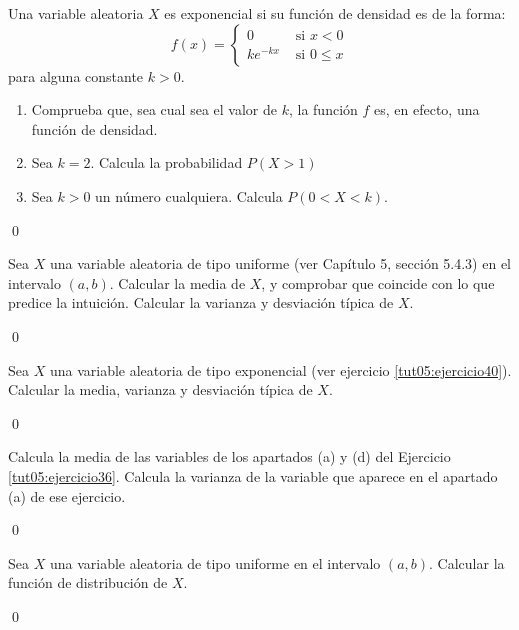 \documentclass[10pt,a4paper]{article}\usepackage[]{graphicx}\usepackage[]{color}
\newcounter{cont01}
\newcounter{EjerExpo}
\begin{document}
\begin{ejercicio}
\label{tut05:ejercicio40}
Una variable aleatoria $X$ es {\sf exponencial} si su función de densidad es de la forma:
	\[f(x)=\begin{cases}
    0&\mbox{ si } x<0\\
    ke^{-kx}&\mbox{ si }0\leq x
    \end{cases}
    \]
    para alguna constante $k>0$.
    \begin{enumerate}
    	\item Comprueba que, sea cual sea el valor de $k$, la función $f$ es, en efecto, una función de 				densidad.
        \item Sea $k=2$. Calcula la probabilidad $P(X>1)$
        \item Sea $k>0$ un número cualquiera. Calcula $P(0<X<k)$.
    \end{enumerate}
    \setcounter{EjerExpo}{\theenumi}

    \setcounter{cont01}{\theenumi}


\qed\end{ejercicio}
\begin{ejercicio}
\label{tut05:ejercicio41}
Sea $X$ una variable aleatoria de tipo uniforme (ver Capítulo 5, sección 5.4.3) en el 					intervalo $(a,b)$. Calcular la media de $X$, y comprobar que coincide con lo que predice la 				intuición. Calcular la varianza y desviación típica de $X$.


\qed\end{ejercicio}
\begin{ejercicio}
\label{tut05:ejercicio42}
Sea $X$ una variable aleatoria de tipo exponencial (ver ejercicio \ref{tut05:ejercicio40}).
    Calcular la media, varianza y desviación típica de $X$.

\qed\end{ejercicio}
\begin{ejercicio}
\label{tut05:ejercicio43}
Calcula la media de las variables de los apartados (a) y (d) del Ejercicio \ref{tut05:ejercicio36}.     Calcula la varianza de la variable que aparece en el apartado (a)  de ese ejercicio.


\qed\end{ejercicio}
\begin{ejercicio}
\label{tut05:ejercicio44}
Sea $X$ una variable aleatoria de tipo uniforme en el intervalo $(a,b)$. Calcular la función 				de distribución de $X$.

\qed\end{ejercicio}
\end{document}
